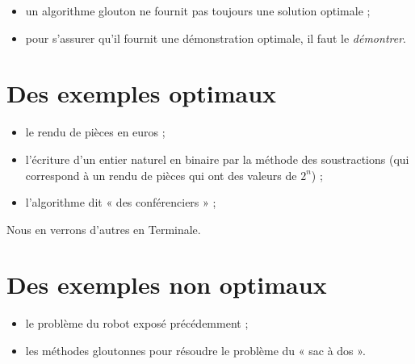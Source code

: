 \begin{aretenir}
\begin{itemize}
\item  un algorithme glouton ne fournit pas toujours une solution optimale ;
\item pour s'assurer qu'il fournit une démonstration optimale, il faut le \textit{démontrer}.
\end{itemize}
\end{aretenir}

\section{Des exemples optimaux}

\begin{itemize}
	\item le rendu de pièces en euros ;
	\item l'écriture d'un entier naturel en binaire par la méthode des soustractions (qui correspond à un rendu de pièces qui ont des valeurs de $2^n$) ;
	\item l'algorithme dit « des conférenciers » ;	
\end{itemize}
Nous en verrons d'autres en Terminale.

\section{Des exemples non optimaux}

\begin{itemize}
	\item le problème du robot exposé précédemment ;
	\item les méthodes gloutonnes pour résoudre le problème du « sac à dos ».
\end{itemize}

